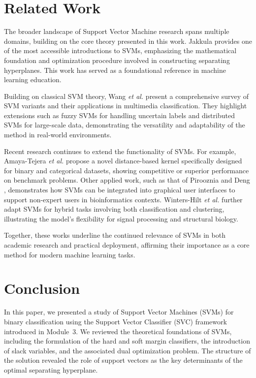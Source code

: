 \documentclass[conference]{IEEEtran}
\begin{document}
	\section{Related Work}
	
	The broader landscape of Support Vector Machine research spans multiple domains, building on the core theory presented in this work. Jakkula \cite{jakkula2006tutorial} provides one of the most accessible introductions to SVMs, emphasizing the mathematical foundation and optimization procedure involved in constructing separating hyperplanes. This work has served as a foundational reference in machine learning education.
	
	Building on classical SVM theory, Wang \textit{et al.} \cite{wang2017survey} present a comprehensive survey of SVM variants and their applications in multimedia classification. They highlight extensions such as fuzzy SVMs for handling uncertain labels and distributed SVMs for large-scale data, demonstrating the versatility and adaptability of the method in real-world environments.
	
	Recent research continues to extend the functionality of SVMs. For example, Amaya-Tejera \textit{et al.} \cite{amaya2024distance} propose a novel distance-based kernel specifically designed for binary and categorical datasets, showing competitive or superior performance on benchmark problems. Other applied work, such as that of Pirooznia and Deng \cite{pirooznia2006svm}, demonstrates how SVMs can be integrated into graphical user interfaces to support non-expert users in bioinformatics contexts. Winters-Hilt \textit{et al.} \cite{winters2006svm} further adapt SVMs for hybrid tasks involving both classification and clustering, illustrating the model's flexibility for signal processing and structural biology.
	
	Together, these works underline the continued relevance of SVMs in both academic research and practical deployment, affirming their importance as a core method for modern machine learning tasks.
	
	\section{Conclusion}
	
	In this paper, we presented a study of Support Vector Machines (SVMs) for binary classification using the Support Vector Classifier (SVC) framework introduced in Module~3. We reviewed the theoretical foundations of SVMs, including the formulation of the hard and soft margin classifiers, the introduction of slack variables, and the associated dual optimization problem. The structure of the solution revealed the role of support vectors as the key determinants of the optimal separating hyperplane.
	
\end{document}
